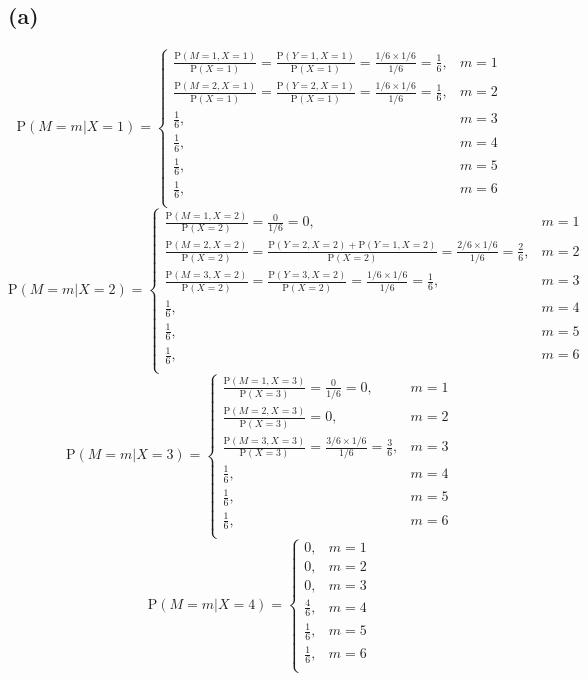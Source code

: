 \documentclass{article}
\begin{document}
\subsection*{(a)}
\[
\text{P}(M = m | X=1) = 
\begin{cases}
\frac{\text{P}(M=1,X=1)}{\text{P}(X=1)} = \frac{\text{P}(Y=1,X=1)}{\text{P}(X=1)} =  \frac{1/6 \times 1/6}{1/6} = \frac{1}{6}, & m = 1\\
\frac{\text{P}(M=2,X=1)}{\text{P}(X=1)} = \frac{\text{P}(Y=2,X=1)}{\text{P}(X=1)} = \frac{1/6 \times 1/6}{1/6} = \frac{1}{6}, & m = 2\\
\frac{1}{6}, & m = 3\\
\frac{1}{6}, & m = 4\\
\frac{1}{6}, & m = 5\\
\frac{1}{6}, & m = 6\\
\end{cases}
\]
\[
\text{P}(M = m | X=2) = 
\begin{cases}
\frac{\text{P}(M=1,X=2)}{\text{P}(X=2)} = \frac{0}{1/6} =0, & m = 1\\
\frac{\text{P}(M=2,X=2)}{\text{P}(X=2)} = \frac{\text{P}(Y=2,X=2)+\text{P}(Y=1,X=2)}{\text{P}(X=2)}  = \frac{2/6 \times 1/6}{1/6} = \frac{2}{6}, & m = 2\\
\frac{\text{P}(M=3,X=2)}{\text{P}(X=2)} =  \frac{\text{P}(Y=3,X=2)}{\text{P}(X=2)} = \frac{1/6 \times 1/6}{1/6} = \frac{1}{6}, & m = 3\\
\frac{1}{6}, & m = 4\\
\frac{1}{6}, & m = 5\\
\frac{1}{6}, & m = 6\\
\end{cases}
\]
\[
\text{P}(M = m | X=3) = 
\begin{cases}
\frac{\text{P}(M=1,X=3)}{\text{P}(X=3)} = \frac{0}{1/6} =0, & m = 1\\
\frac{\text{P}(M=2,X=3)}{\text{P}(X=3)} = 0, & m = 2\\
\frac{\text{P}(M=3,X=3)}{\text{P}(X=3)} = \frac{3/6 \times 1/6}{1/6} = \frac{3}{6}, & m = 3\\
\frac{1}{6}, & m = 4\\
\frac{1}{6}, & m = 5\\
\frac{1}{6}, & m = 6\\
\end{cases}
\]
\[
\text{P}(M = m | X=4) = 
\begin{cases}
0, & m = 1\\
0, & m = 2\\
0, & m = 3\\
\frac{4}{6}, & m = 4\\
\frac{1}{6}, & m = 5\\
\frac{1}{6}, & m = 6\\
\end{cases}
\]
\end{document}
